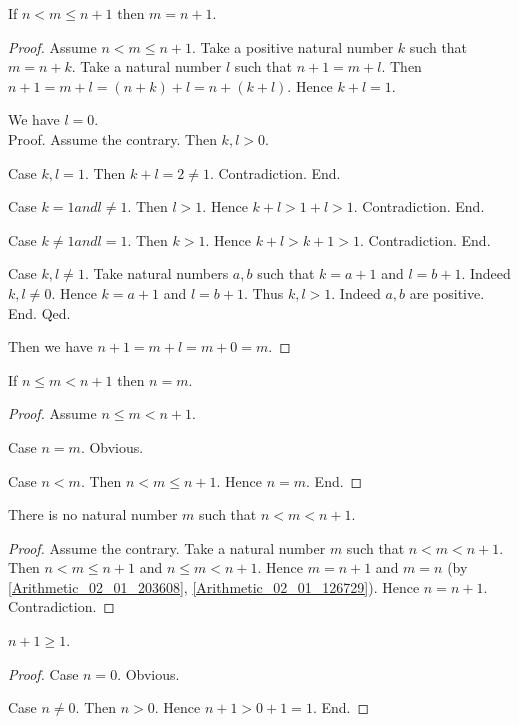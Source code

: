 \documentclass[../../arithmetic.ftl.tex]{subfiles}
\begin{document}
  \begin{forthel}
    \begin{proposition}\label{Arithmetic_02_01_203608}
      If $n < m \leq n + 1$ then $m = n + 1$.
    \end{proposition}
    \begin{proof}
      Assume $n < m \leq n + 1$.
      Take a positive natural number $k$ such that $m = n + k$.
      Take a natural number $l$ such that $n + 1 = m + l$.
      Then $n + 1 = m + l = (n + k) + l = n + (k + l)$.
      Hence $k + l = 1$.

      We have $l = 0$. \\
      Proof.
        Assume the contrary.
        Then $k,l > 0$.

        Case $k,l = 1$.
          Then $k + l = 2 \neq 1$.
          Contradiction.
        End.

        Case $k = 1 and l \neq 1$.
          Then $l > 1$.
          Hence $k + l > 1 + l > 1$.
          Contradiction.
        End.

        Case $k \neq 1 and l = 1$.
          Then $k > 1$.
          Hence $k + l > k + 1 > 1$.
          Contradiction.
        End.

        Case $k,l \neq 1$.
          Take natural numbers $a,b$ such that $k = a + 1$ and $l = b + 1$.
          Indeed $k,l \neq 0$.
          Hence $k = a + 1$ and $l = b + 1$.
          Thus $k,l > 1$. Indeed $a,b$ are positive.
        End.
      Qed.

      Then we have $n + 1 = m + l = m + 0 = m$.
    \end{proof}


    \begin{proposition}\label{Arithmetic_02_01_126729}
      If $n \leq m < n + 1$ then $n = m$.
    \end{proposition}
    \begin{proof}
      Assume $n \leq m < n + 1$.

      Case $n = m$. Obvious.

      Case $n < m$.
        Then $n < m \leq n + 1$.
        Hence $n = m$.
      End.
    \end{proof}


    \begin{corollary}\label{Arithmetic_02_01_666910}
      There is no natural number $m$ such that $n < m < n + 1$.
    \end{corollary}
    \begin{proof}
      Assume the contrary.
      Take a natural number $m$ such that $n < m < n + 1$.
      Then $n < m \leq n + 1$ and $n \leq m < n + 1$.
      Hence $m = n + 1$ and $m = n$ (by \ref{Arithmetic_02_01_203608}, \ref{Arithmetic_02_01_126729}).
      Hence $n = n + 1$.
      Contradiction.
    \end{proof}


    \begin{proposition}\label{Arithmetic_02_01_408119}
      $n + 1 \geq 1$.
    \end{proposition}
    \begin{proof}
      Case $n = 0$. Obvious.

      Case $n \neq 0$.
        Then $n > 0$.
        Hence $n + 1 > 0 + 1 = 1$.
      End.
    \end{proof}
  \end{forthel}
\end{document}
